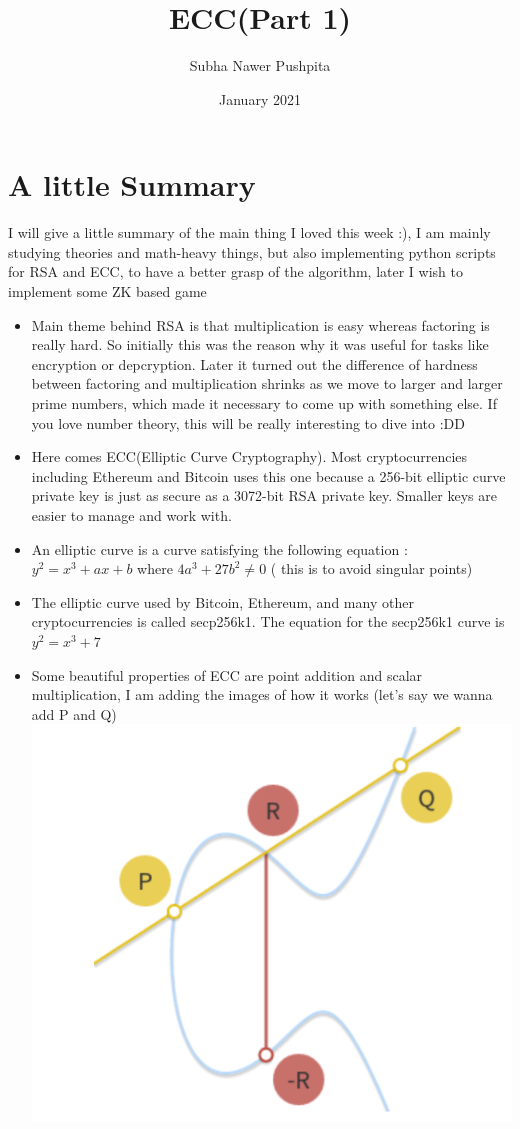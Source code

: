 \documentclass{article}
\title{ECC(Part 1)}
\author{Subha Nawer Pushpita}
\date{January 2021}
\begin{document}
\maketitle

\section{A little Summary}
I will give a little summary of the main thing I loved this week :), I am mainly studying theories and math-heavy things, but also implementing python scripts for RSA and ECC, to have a better grasp of the algorithm, later I wish to implement some ZK based game 
\begin{itemize}
    \item Main theme behind RSA is that multiplication is easy whereas factoring is really hard. So initially this was the reason why it was useful for tasks like encryption or depcryption. Later it turned out the difference of hardness between factoring and multiplication shrinks as we move to larger and larger prime numbers, which made it necessary to come up with something else. If you love number theory, this will be really interesting to dive into :DD
    \item Here comes ECC(Elliptic Curve Cryptography). Most cryptocurrencies including Ethereum and Bitcoin uses this one because a 256-bit elliptic curve private key is just as secure as a 3072-bit RSA private key. Smaller keys are easier to manage and work with. 
    \item An elliptic curve is a curve satisfying the following equation : $y^2=x^3+ax+b$ where $4a^3 + 27b^2 \ne 0$ ( this is to avoid singular points)
    \item The elliptic curve used by Bitcoin, Ethereum, and many other cryptocurrencies is called secp256k1. The equation for the secp256k1 curve is $y^2 = x^3+7$
    \item Some beautiful properties of ECC are point addition and scalar multiplication, I am adding the images of how it works (let’s say we wanna add P and Q)\\
    \includegraphics[scale=0.7]{add3.PNG}

\end{itemize}
\end{document}
